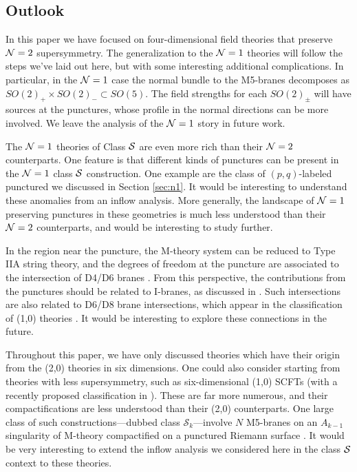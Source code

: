 \documentclass[a4paper,11pt]{article}
\def\CN{{\cal N}}
\def\CS{{\cal S}}
\newcommand{\mc}[1]{\mathcal{ #1} }
\begin{document}
\subsection{Outlook}%


In this paper we have focused on four-dimensional field theories that preserve $\CN=2$ supersymmetry. The generalization to the $\CN=1$ theories will follow the steps we've laid out here, but with some interesting additional complications. In particular,  in the $\CN=1$ case the normal bundle to the M5-branes decomposes as $SO(2)_+\times SO(2)_- \subset SO(5)$. The field strengths for each $SO(2)_\pm$ will have sources at the punctures, whose profile in the normal directions can be more involved. We leave the analysis of the $\CN=1$ story in future work.

The $\CN=1$ theories of Class $\CS$ are even more rich than their $\CN=2$ counterparts. One feature is that different kinds of punctures can be present in the $\CN=1$ class $\CS$  construction. One example are the class of $(p,q)$-labeled punctured we discussed in Section \ref{sec:n1}. It would be interesting to understand these anomalies from an inflow analysis. More generally, the landscape of $\CN=1$ preserving punctures in these geometries is much less understood than their $\CN=2$ counterparts, and would be interesting to study further.

In the region near the puncture, the M-theory system can be reduced to Type IIA string theory, and the degrees of freedom at the puncture are associated to the intersection of D4/D6 branes \cite{Witten:1997sc}. From this perspective, the contributions from the punctures should be related to I-branes, as discussed in \cite{Green:1996dd}. Such intersections are also related to D6/D8 brane intersections, which appear in the classification of (1,0) theories \cite{Gaiotto:2014lca}. It would be interesting to explore these connections in the future. 

Throughout this paper, we have only discussed theories which have their origin from the (2,0) theories in six dimensions. One could also consider starting from theories with less supersymmetry, such as six-dimensional (1,0) SCFTs (with a recently proposed classification in \cite{Heckman:2013pva,Heckman:2015bfa,Bhardwaj:2015xxa}). These are far more numerous, and their compactifications are less understood than their (2,0) counterparts. One large class of such constructions---dubbed class $\mc{S}_k$---involve $N$ M5-branes on an $A_{k-1}$ singularity of M-theory compactified on a punctured Riemann surface \cite{Gaiotto:2015usa,Hanany:2015pfa,Razamat:2016dpl,Bah:2017gph}. It would be very interesting to extend the inflow analysis we considered here in the class $\CS$ context to these theories. 
\end{document}
